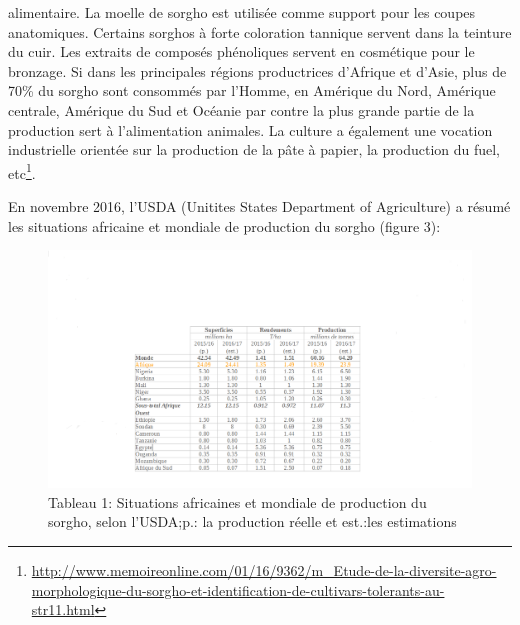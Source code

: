 \documentclass[a4paper,11pt]{article}
\begin{document}
alimentaire. La moelle de sorgho est utilisée comme support pour les
coupes anatomiques. Certains sorghos à forte coloration tannique
servent dans la teinture du cuir. Les extraits de composés phénoliques
servent en cosmétique pour le bronzage. Si dans les principales
régions productrices d’Afrique et d’Asie, plus de 70\% du sorgho sont
consommés par l’Homme, en Amérique du Nord, Amérique centrale,
Amérique du Sud et Océanie par contre la plus grande partie de la
production sert à l’alimentation animales\cite{BARRO_KONDOMBO_2010}. La
culture a également une vocation industrielle orientée sur la
production de la pâte à papier, la production du fuel,
etc\footnote{\url{http://www.memoireonline.com/01/16/9362/m_Etude-de-la-diversite-agro-morphologique-du-sorgho-et-identification-de-cultivars-tolerants-au-str11.html}}.

En novembre 2016, l’USDA (Unitites States Department of Agriculture) a résumé les situations africaine et mondiale de production du sorgho (figure 3):


\begin{figure}%
  \begin{center}
   \includegraphics[width=14cm]{images/WorldSorghumStatisticsUsda}
  \end{center}
  \caption{Tableau 1: Situations africaines et mondiale de production du sorgho, selon l’USDA;p.:
    la production réelle et est.:les estimations}
\end{figure}
\end{document}
